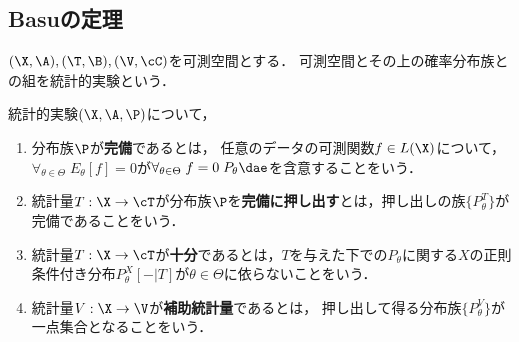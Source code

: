 \documentclass[uplatex,dvipdfmx]{jsarticle}
\begin{document}
\subsection{Basuの定理}

\begin{notation}
    $(\X,\A),(\T,\B),(\V,\cC)$を可測空間とする．
    可測空間とその上の確率分布族との組を統計的実験という．
\end{notation}

\begin{definition}
    統計的実験$(\X,\A,\P)$について，
    \begin{enumerate}
        \item 分布族$\P$が\textbf{完備}であるとは，
        任意のデータの可測関数$f\in L(\X)$について，$\forall_{\theta\in\Theta}\;E_\theta[f]=0$が$\forall_{\theta\in\Theta}\;f=0\;P_\theta\dae$を含意することをいう．
        \item 統計量$T:\X\to\cT$が分布族$\P$を\textbf{完備に押し出す}とは，押し出しの族$\{P^T_\theta\}$が完備であることをいう．
        \item 統計量$T:\X\to\cT$が\textbf{十分}であるとは，$T$を与えた下での$P_\theta$に関する$X$の正則条件付き分布$P_\theta^X[-|T]$が$\theta\in\Theta$に依らないことをいう．
        \item 統計量$V:\X\to\V$が\textbf{補助統計量}であるとは，
        押し出して得る分布族$\{P_\theta^V\}$が一点集合となることをいう．
    \end{enumerate}
\end{definition}
\end{document}
